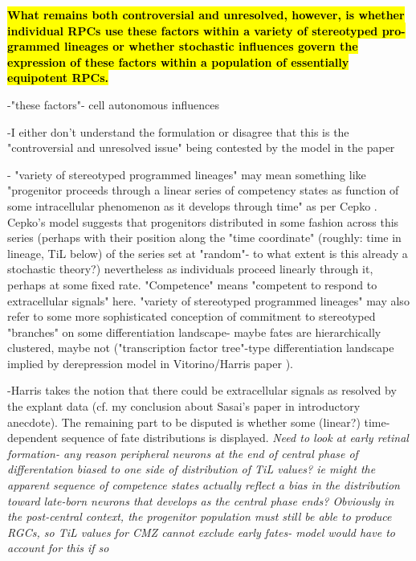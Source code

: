 \bigskip

\textbf{\hl{What remains both
controversial and unresolved, however, is whether individual
RPCs use these factors within a variety of stereotyped pro-
grammed lineages or whether stochastic influences govern the
expression of these factors within a population of essentially
equipotent RPCs. }}

\bigskip

-"these factors"- cell autonomous influences

-I either don't understand the formulation or disagree that this is the "controversial and unresolved issue" being contested by the model in the paper

- "variety of stereotyped programmed lineages" may mean something like "progenitor proceeds through a linear series of competency states as function of some intracellular phenomenon as it develops through time" as per Cepko \cite{Cepko1996}. Cepko's model suggests that progenitors distributed in some fashion across this series (perhaps with their position along the "time coordinate" (roughly: time in lineage, TiL below) of the series set at "random"- to what extent is this already a stochastic theory?) nevertheless as individuals proceed linearly through it, perhaps at some fixed rate. "Competence" means "competent to respond to extracellular signals" here. "variety of stereotyped programmed lineages" may also refer to some more sophisticated conception of commitment to stereotyped "branches" on some differentiation landscape- maybe fates are hierarchically clustered, maybe not ("transcription factor tree"-type differentiation landscape implied by derepression model in Vitorino/Harris paper \cite{Vitorino2009}).

-Harris takes the notion that there could be extracellular signals as resolved by the explant data (cf. my conclusion about Sasai's paper in introductory anecdote). The remaining part to be disputed is whether some (linear?) time-dependent sequence of fate distributions is displayed. \textit{Need to look at early retinal formation- any reason peripheral neurons at the end of central phase of differentation biased to one side of distribution of TiL values? ie might the apparent sequence of competence states actually reflect a bias in the distribution toward late-born neurons that develops as the central phase ends? Obviously in the post-central context, the progenitor population must still be able to produce RGCs, so TiL values for CMZ cannot exclude early fates- model would have to account for this if so}

